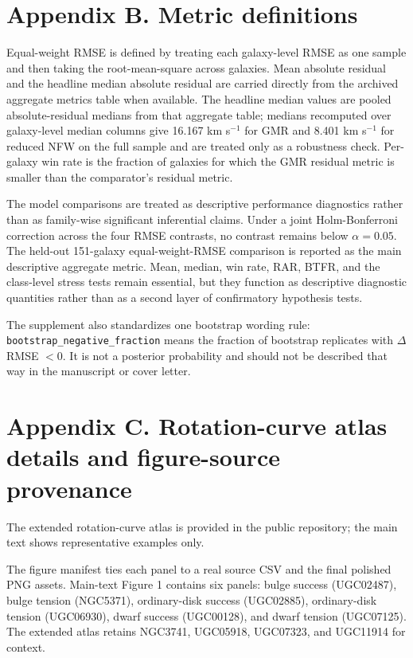 \documentclass[twocolumn,linenumbers]{aastex701}
\begin{document}
\section{Appendix B. Metric definitions}

Equal-weight RMSE is defined by treating each galaxy-level RMSE as one sample and then taking the root-mean-square across galaxies. Mean absolute residual and the headline median absolute residual are carried directly from the archived aggregate metrics table when available. The headline median values are pooled absolute-residual medians from that aggregate table; medians recomputed over galaxy-level median columns give 16.167 km s$^{-1}$ for GMR and 8.401 km s$^{-1}$ for reduced NFW on the full sample and are treated only as a robustness check. Per-galaxy win rate is the fraction of galaxies for which the GMR residual metric is smaller than the comparator's residual metric.

The model comparisons are treated as descriptive performance diagnostics rather than as family-wise significant inferential claims. Under a joint Holm-Bonferroni correction across the four RMSE contrasts, no contrast remains below $\alpha=0.05$. The held-out 151-galaxy equal-weight-RMSE comparison is reported as the main descriptive aggregate metric. Mean, median, win rate, RAR, BTFR, and the class-level stress tests remain essential, but they function as descriptive diagnostic quantities rather than as a second layer of confirmatory hypothesis tests.

The supplement also standardizes one bootstrap wording rule: \texttt{bootstrap\_negative\_fraction} means the fraction of bootstrap replicates with $\Delta$RMSE $< 0$. It is not a posterior probability and should not be described that way in the manuscript or cover letter.



\section{Appendix C. Rotation-curve atlas details and figure-source provenance}

The extended rotation-curve atlas is provided in the public repository; the main text shows representative examples only.

The figure manifest ties each panel to a real source CSV and the final polished PNG assets. Main-text Figure 1 contains six panels: bulge success (UGC02487), bulge tension (NGC5371), ordinary-disk success (UGC02885), ordinary-disk tension (UGC06930), dwarf success (UGC00128), and dwarf tension (UGC07125). The extended atlas retains NGC3741, UGC05918, UGC07323, and UGC11914 for context.
\end{document}
